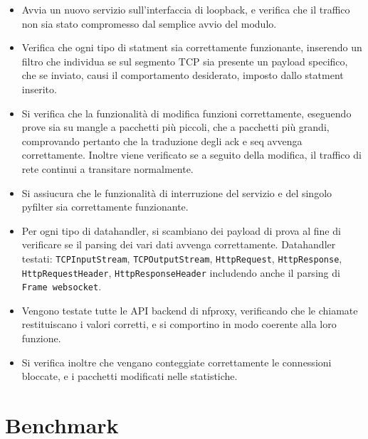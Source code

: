 \begin{itemize}
    \setlength{\itemsep}{1pt}
    \setlength{\parskip}{1pt}
    \item Avvia un nuovo servizio sull'interfaccia di loopback, e verifica che il traffico non sia stato compromesso dal semplice avvio del modulo.
    \item Verifica che ogni tipo di statment sia correttamente funzionante, inserendo un filtro che individua se sul segmento TCP sia presente un payload specifico, che se inviato, causi il comportamento desiderato, imposto dallo statment inserito.
    \item Si verifica che la funzionalità di modifica funzioni correttamente, eseguendo prove sia su mangle a pacchetti più piccoli, che a pacchetti più grandi, comprovando pertanto che la traduzione degli ack e seq avvenga correttamente. Inoltre viene verificato se a seguito della modifica, il traffico di rete continui a transitare normalmente.
    \item Si assiucura che le funzionalità di interruzione del servizio e del singolo pyfilter sia correttamente funzionante.
    \item Per ogni tipo di datahandler, si scambiano dei payload di prova al fine di verificare se il parsing dei vari dati avvenga correttamente. Datahandler testati: \texttt{TCPInputStream}, \texttt{TCPOutputStream}, \texttt{HttpRequest}, \texttt{HttpResponse}, \texttt{HttpRequestHeader},
    \texttt{HttpResponseHeader} includendo anche il parsing di \texttt{Frame websocket}.
    \item Vengono testate tutte le API backend di nfproxy, verificando che le chiamate restituiscano i valori corretti, e si comportino in modo coerente alla loro funzione.
    \item Si verifica inoltre che vengano conteggiate correttamente le connessioni bloccate, e i pacchetti modificati nelle statistiche.
\end{itemize}

\section{Benchmark}

